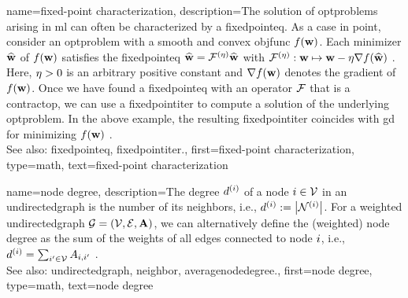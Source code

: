 {name={fixed-point characterization},
	description={The solution of \glspl{optproblem} arising in \gls{ml} 
		can often be characterized by a \gls{fixedpointeq}. 
		As a case in point, consider an \gls{optproblem} with a \gls{smooth} 
		and \gls{convex} \gls{objfunc} $f({\bf w})$. Each minimizer $\widehat{{\bf w}}$ 
		of $f({\bf w})$ satisfies the \gls{fixedpointeq} 
		$\widehat{{\bf w}} = \mathcal{F}^{(\eta)} \widehat{{\bf w}}$ with 
		$\mathcal{F}^{(\eta)}: {\bf w} \mapsto {\bf w}-\eta \nabla f(\widehat{{\bf w}})$ \cite{BoydConvexBook}. 
		Here, $\eta > 0$ is an arbitrary positive constant and 
		$\nabla f({\bf w})$ denotes the \gls{gradient} of $f({\bf w})$.	
		Once we have found a \gls{fixedpointeq} with an \gls{operator} 
		$\mathcal{F}$ that is a \gls{contractop}, we can use a \gls{fixedpointiter} 
		to compute a solution of the underlying \gls{optproblem}. In the 
		above example, the resulting \gls{fixedpointiter} coincides with \gls{gd} for 
		minimizing $f({\bf w})$ \cite{BoydConvexBook}.
	               \\ 
		See also: \gls{fixedpointeq}, \gls{fixedpointiter}.},
	first={fixed-point characterization},
	type=math, 
	text={fixed-point characterization} 
}

{name={node degree},
	description={The degree $d^{(i)}$ of a 
		node $i \in \mathcal{V}$ in an \gls{undirectedgraph} is the 
		number of its \glspl{neighbor}, i.e., 
		$d^{(i)} := \big|\mathcal{N}^{(i)}\big|$.
		For a weighted \gls{undirectedgraph} $\mathcal{G}=(\mathcal{V},\mathcal{E},{\bf A})$, 
		we can alternatively define the (weighted) node degree as the sum 
		of the weights of all edges \gls{connected} to node $i$, i.e.,
		$d^{(i)} = \sum_{i' \in \mathcal{V}} A_{i,i'}$ \cite{OPSAHL2010245}.	
					\\ 
		See also: \gls{undirectedgraph}, \gls{neighbor}, \gls{averagenodedegree}.},
	first={node degree},
	type=math, 
	text={node degree} 
}

